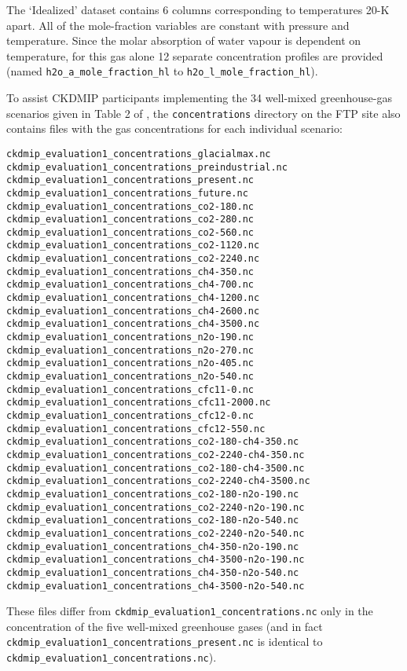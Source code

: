 \documentclass[twoside]{article}
\def\codesize{\small}
\def\code#1{{\codesize\texttt{#1}}}
\begin{document}
The `Idealized' dataset contains 6 columns corresponding to
temperatures 20-K apart. All of the mole-fraction variables are
constant with pressure and temperature. Since the molar absorption of
water vapour is dependent on temperature, for this gas alone 12
separate concentration profiles are provided (named
\code{h2o\_a\_mole\_fraction\_hl} to
\code{h2o\_l\_mole\_fraction\_hl}).

To assist CKDMIP participants implementing the 34 well-mixed
greenhouse-gas scenarios given in Table 2 of \cite{Hogan+2020}, the
\code{concentrations} directory on the FTP site also contains files
with the gas concentrations for each individual scenario:
\begin{verbatim}
ckdmip_evaluation1_concentrations_glacialmax.nc
ckdmip_evaluation1_concentrations_preindustrial.nc
ckdmip_evaluation1_concentrations_present.nc
ckdmip_evaluation1_concentrations_future.nc
ckdmip_evaluation1_concentrations_co2-180.nc
ckdmip_evaluation1_concentrations_co2-280.nc
ckdmip_evaluation1_concentrations_co2-560.nc
ckdmip_evaluation1_concentrations_co2-1120.nc
ckdmip_evaluation1_concentrations_co2-2240.nc
ckdmip_evaluation1_concentrations_ch4-350.nc
ckdmip_evaluation1_concentrations_ch4-700.nc
ckdmip_evaluation1_concentrations_ch4-1200.nc
ckdmip_evaluation1_concentrations_ch4-2600.nc
ckdmip_evaluation1_concentrations_ch4-3500.nc
ckdmip_evaluation1_concentrations_n2o-190.nc
ckdmip_evaluation1_concentrations_n2o-270.nc
ckdmip_evaluation1_concentrations_n2o-405.nc
ckdmip_evaluation1_concentrations_n2o-540.nc
ckdmip_evaluation1_concentrations_cfc11-0.nc
ckdmip_evaluation1_concentrations_cfc11-2000.nc
ckdmip_evaluation1_concentrations_cfc12-0.nc
ckdmip_evaluation1_concentrations_cfc12-550.nc
ckdmip_evaluation1_concentrations_co2-180-ch4-350.nc
ckdmip_evaluation1_concentrations_co2-2240-ch4-350.nc
ckdmip_evaluation1_concentrations_co2-180-ch4-3500.nc
ckdmip_evaluation1_concentrations_co2-2240-ch4-3500.nc
ckdmip_evaluation1_concentrations_co2-180-n2o-190.nc
ckdmip_evaluation1_concentrations_co2-2240-n2o-190.nc
ckdmip_evaluation1_concentrations_co2-180-n2o-540.nc
ckdmip_evaluation1_concentrations_co2-2240-n2o-540.nc
ckdmip_evaluation1_concentrations_ch4-350-n2o-190.nc
ckdmip_evaluation1_concentrations_ch4-3500-n2o-190.nc
ckdmip_evaluation1_concentrations_ch4-350-n2o-540.nc
ckdmip_evaluation1_concentrations_ch4-3500-n2o-540.nc
\end{verbatim}
These files differ from \code{ckdmip\_evaluation1\_concentrations.nc}
only in the concentration of the five well-mixed greenhouse gases (and
in fact \code{ckdmip\_evaluation1\_concentrations\_present.nc} is
identical to \code{ckdmip\_evaluation1\_concentrations.nc}).
\end{document}
